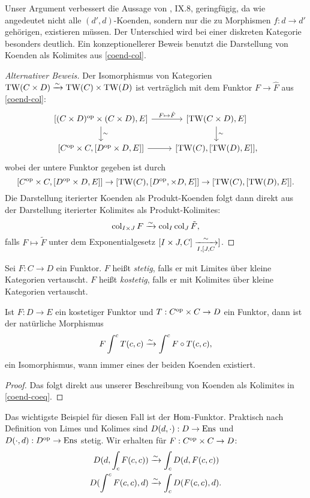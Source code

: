 \begin{bem}
  Unser Argument verbessert die Aussage von \cite{ML}, IX.8,
  geringfügig, da wie angedeutet nicht alle $(d', d)$-Koenden, sondern
  nur die zu Morphismen $f: d \to d'$ gehörigen, existieren
  müssen. Der Unterschied wird bei einer diskreten Kategorie besonders
  deutlich. Ein konzeptionellerer Beweis benutzt die Darstellung von
  Koenden als Kolimites aus \ref{coend-col}.
\end{bem}
\begin{proof}[Alternativer Beweis]
  Der Isomorphismus von Kategorien $\operatorname{TW}(C \times D) \xrightarrow[]{\sim} \operatorname{TW}(C) \times
  \operatorname{TW}(D)$ ist verträglich mit dem Funktor $F \to \hat{F}$ aus
  \ref{coend-col}:
  \[ \begin{tikzcd}
    {[(C \times D)\op \times (C \times D), E]}
    \arrow{d}{\sim} \arrow{r}{F \mapsto \hat{F}}
    & {[\TW(C \times D), E]} \arrow{d}{\sim} \\
    {[C\op \times C, [D\op \times D, E]]} \arrow{r}
    & {[\TW(C), [\TW(D), E]]},
  \end{tikzcd}
  \]
  wobei der untere Funktor gegeben ist durch
  \[ [C^\mathrm{op} \times C, [D^\mathrm{op} \times D, E]]
  \to [\operatorname{TW}(C), [D^\mathrm{op}, \times D, E]] \to [\operatorname{TW}(C), [\operatorname{TW}(D), E]].
  \]
  Die Darstellung iterierter Koenden als Produkt-Koenden folgt dann
  direkt aus der Darstellung iterierter Kolimites als
  Produkt-Kolimites:
  \[ \operatorname{col}_{I \times J} F \xrightarrow[]{\sim} \operatorname{col}_I \operatorname{col}_J \tilde{F}, \]
  falls $F \mapsto \tilde{F}$ unter dem Exponentialgesetz $[I \times
    J, C] \xrightarrow[I, [J, C]{\sim}]$.
\end{proof}

\begin{defn}
  Sei $F: C \to D$ ein Funktor. $F$ heißt \emph{stetig}, falls er mit
  Limites über kleine Kategorien vertauscht. $F$ heißt
  \emph{kostetig}, falls er mit Kolimites über kleine Kategorien
  vertauscht.
\end{defn}

\begin{lemma}
  \label{coend-cocont}
  Ist $F: D \to E$ ein kostetiger Funktor und $T: C^\mathrm{op} \times C \to D$
  ein Funktor, dann ist der natürliche Morphismus
  \[ F \int^c T(c, c) \xrightarrow[]{\sim} \int^c F \circ T(c, c), \]
  ein Isomorphismus, wann immer eines der beiden Koenden existiert.
\end{lemma}
\begin{proof}
  Das folgt direkt aus unserer Beschreibung von Koenden als Kolimites
  in \ref{coend-coeq}.
\end{proof}
\begin{bem}
  Das wichtigste Beispiel für diesen Fall ist der
  $\operatorname{Hom}$-Funktor. Praktisch nach Definition von Limes und Kolimes sind
  $D(d, \cdot): D \to \operatorname{Ens}$ und $D(\cdot, d): D^\mathrm{op} \to \operatorname{Ens}$
  stetig. Wir erhalten für $F: C^\mathrm{op} \times C \to D$:
  \begin{align*}
    D(d, \int_c F(c, c)) & \xrightarrow[]{\sim} \int_c D(d, F(c, c)) \\
    D(\int^c F(c, c), d) &\xrightarrow[]{\sim} \int_c D(F(c, c), d).
  \end{align*}
\end{bem}

